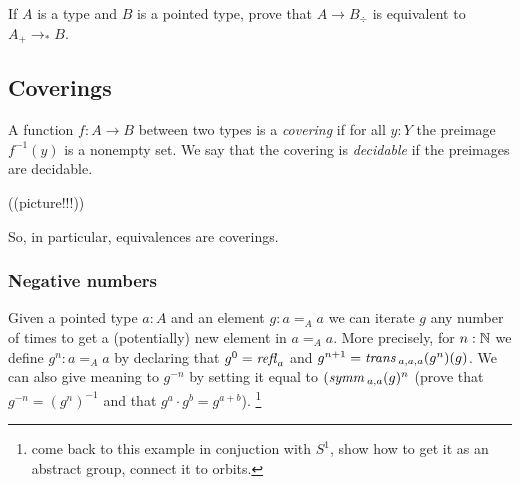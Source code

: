 \begin{definition}
\begin{xca}
  If $A$ is a type and $B$ is a pointed type, prove that $A\to B_\div$ is equivalent to $A_+\to_*B$.
\end{xca}

\subsection{Coverings}
\label{sec:covering}

\begin{definition}
  \label{def:covering}
  A function $f:A\to B$ between two types is a \emph{covering} if for all $y:Y$ the preimage $f^{-1}(y)$ is a nonempty set.  We say that the covering is \emph{decidable} if the preimages are decidable.
\end{definition}

((picture!!!))

So, in particular, equivalences are coverings.

\subsubsection{Negative numbers}
\label{sec:negativenumbers}

 \begin{example}\label{ex:orbitofanelement}
   Given a pointed type $a:A$ and an element $g: a=_Aa$ we can iterate $g$ any number of times to get a (potentially) new element in $a=_Aa$. More precisely, for $n:\mathbb{N}$ we define $g^n:a=_Aa$ by declaring that $g^0=\mathop{{\it refl}_{a}}$ and $g^{n+1}=\mathop{\mathit{trans}}{}_{a,a,a}(g^n)(g)$.  We can also give meaning to $g^{-n}$ by setting it equal to $(\mathop{\mathit{symm}}{}_{a,a}(g)^n$ (prove that $g^{-n}=(g^n)^{-1}$ and that $g^a\cdot g^b=g^{a+b}$).  \footnote{come back to this example in conjuction with $S^1$, show how to get it as an abstract group, connect it to orbits.}


\end{example}
\end{definition}
